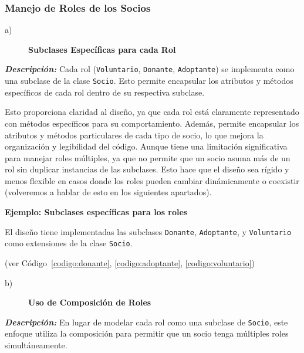 \subsubsection{Manejo de Roles de los Socios}

\begin{description}
    \item[a)] \textbf{Subclases Específicas para cada Rol}
\end{description}

\textit{\textbf{Descripción:}}  
Cada rol (\texttt{Voluntario}, \texttt{Donante}, \texttt{Adoptante}) se implementa como una 
subclase de la clase \texttt{Socio}. Esto permite encapsular los atributos y métodos 
específicos de cada rol dentro de su respectiva subclase.
\vspace{0.15cm}


Esto proporciona claridad al diseño, ya que cada rol está claramente representado con 
métodos específicos para su comportamiento. Además, permite encapsular los atributos y 
métodos particulares de cada tipo de socio, lo que mejora la organización y legibilidad 
del código. Aunque tiene una limitación significativa para manejar roles múltiples, ya que no permite que 
un socio asuma más de un rol sin duplicar instancias de las subclases. Esto hace que el 
diseño sea rígido y menos flexible en casos donde los roles pueden cambiar dinámicamente 
o coexistir (volveremos a hablar de esto en los siguientes apartados).\par
\vspace{0.15cm}



\textbf{Ejemplo: Subclases específicas para los roles}\par
El diseño tiene implementadas las subclases \texttt{Donante}, \texttt{Adoptante}, 
y \texttt{Voluntario} como extensiones de la clase \texttt{Socio}.\par
(ver Código~\ref{codigo:donante}, \ref{codigo:adoptante}, \ref{codigo:voluntario})

\begin{description}
    \item[b)] \textbf{Uso de Composición de Roles}
\end{description}

\textit{\textbf{Descripción:}}  
En lugar de modelar cada rol como una subclase de \texttt{Socio}, este enfoque utiliza 
la composición para permitir que un socio tenga múltiples roles simultáneamente. 
\vspace{0.15cm}


